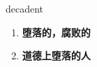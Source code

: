 
\begin{frame}
{\huge decadent}
\begin{center}
\begin{enumerate}\Large
  \item \textbf{堕落的，腐败的}
  \item \textbf{道德上堕落的人}
\end{enumerate}
\end{center}
\end{frame}
